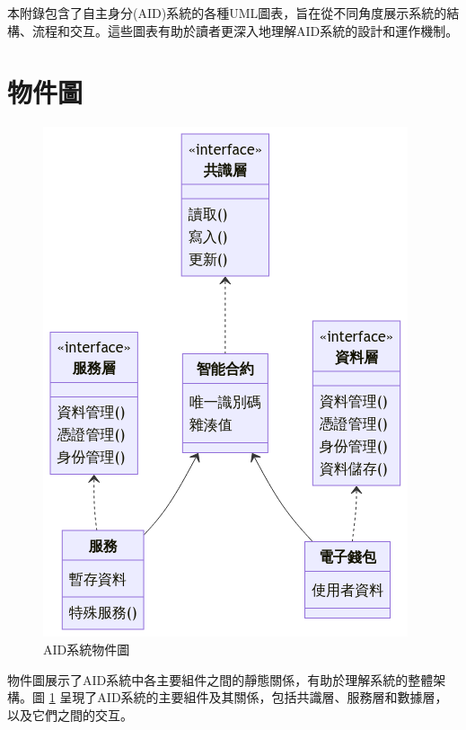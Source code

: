 
本附錄包含了自主身分(AID)系統的各種UML圖表，旨在從不同角度展示系統的結構、流程和交互。這些圖表有助於讀者更深入地理解AID系統的設計和運作機制。
\section{物件圖}
\begin{figure}
  \centering
  \includegraphics[width=0.6\linewidth]{figures/design-struct.png}
  \caption{AID系統物件圖}
  \label{fig:appendix-aid-struct}
\end{figure}
物件圖展示了AID系統中各主要組件之間的靜態關係，有助於理解系統的整體架構。圖 \ref{fig:appendix-aid-struct} 呈現了AID系統的主要組件及其關係，包括共識層、服務層和數據層，以及它們之間的交互。
